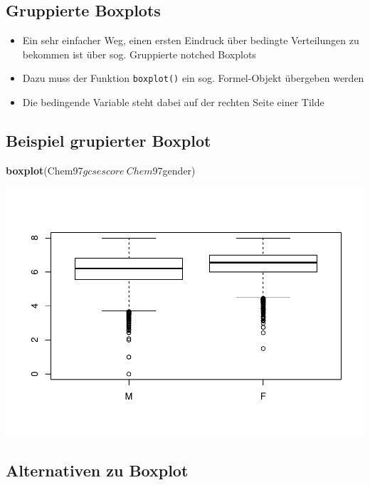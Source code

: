 \documentclass[]{article}
\newenvironment{Shaded}{\begin{snugshade}}{\end{snugshade}}
\newcommand{\KeywordTok}[1]{\textcolor[rgb]{0.13,0.29,0.53}{\textbf{{#1}}}}
\newcommand{\NormalTok}[1]{{#1}}
\providecommand{\tightlist}{%
  \setlength{\itemsep}{0pt}\setlength{\parskip}{0pt}}
\begin{document}
\subsection{Gruppierte Boxplots}\label{gruppierte-boxplots}

\begin{itemize}
\tightlist
\item
  Ein sehr einfacher Weg, einen ersten Eindruck über bedingte
  Verteilungen zu bekommen ist über sog. Gruppierte notched Boxplots
\item
  Dazu muss der Funktion \texttt{boxplot()} ein sog. Formel-Objekt
  übergeben werden
\item
  Die bedingende Variable steht dabei auf der rechten Seite einer Tilde
\end{itemize}

\subsection{Beispiel grupierter
Boxplot}\label{beispiel-grupierter-boxplot}

\begin{Shaded}
\begin{Highlighting}[]
\KeywordTok{boxplot}\NormalTok{(Chem97$gcsescore~Chem97$gender)}
\end{Highlighting}
\end{Shaded}

\includegraphics{Intro_Datenanalyse1_files/figure-latex/unnamed-chunk-153-1.pdf}

\subsection{Alternativen zu Boxplot}\label{alternativen-zu-boxplot}
\end{document}
